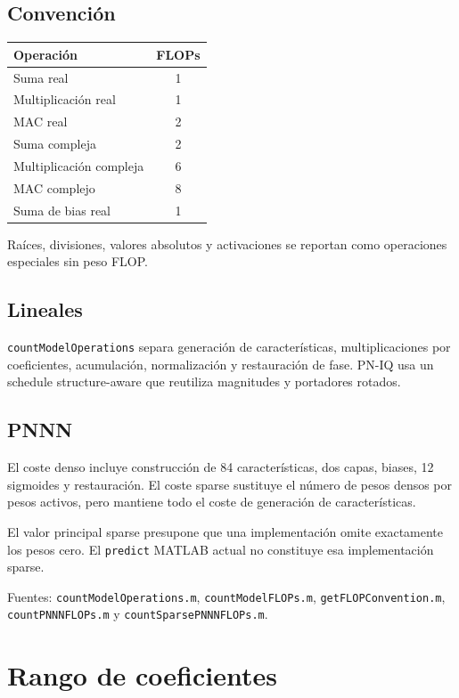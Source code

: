 \documentclass[10pt,a4paper]{article}
\newcommand{\code}[1]{\texttt{#1}}
\begin{document}
\subsection{Convención}

\begin{center}
\begin{tabular}{lc}
\toprule
Operación & FLOPs\\
\midrule
Suma real & 1\\
Multiplicación real & 1\\
MAC real & 2\\
Suma compleja & 2\\
Multiplicación compleja & 6\\
MAC complejo & 8\\
Suma de bias real & 1\\
\bottomrule
\end{tabular}
\end{center}

Raíces, divisiones, valores absolutos y activaciones se reportan como
operaciones especiales sin peso FLOP.

\subsection{Lineales}

\code{countModelOperations} separa generación de características,
multiplicaciones por coeficientes, acumulación, normalización y restauración de
fase. PN-IQ usa un schedule structure-aware que reutiliza magnitudes y
portadores rotados.

\subsection{PNNN}

El coste denso incluye construcción de 84 características, dos capas, biases,
12 sigmoides y restauración. El coste sparse sustituye el número de pesos
densos por pesos activos, pero mantiene todo el coste de generación de
características.

El valor principal sparse presupone que una implementación omite exactamente
los pesos cero. El \code{predict} MATLAB actual no constituye esa
implementación sparse.

Fuentes:
\code{countModelOperations.m},
\code{countModelFLOPs.m},
\code{getFLOPConvention.m},
\code{countPNNNFLOPs.m} y
\code{countSparsePNNNFLOPs.m}.

\section{Rango de coeficientes}
\end{document}
